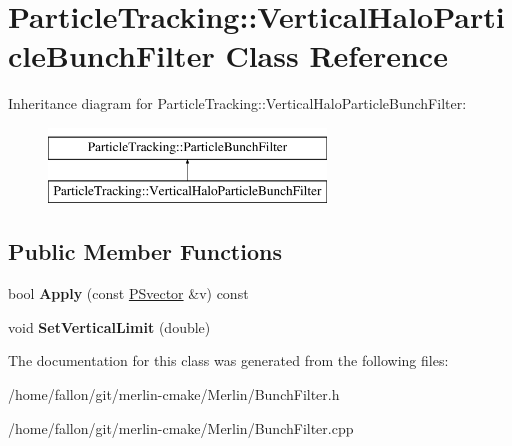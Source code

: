 \hypertarget{classParticleTracking_1_1VerticalHaloParticleBunchFilter}{}\section{Particle\+Tracking\+:\+:Vertical\+Halo\+Particle\+Bunch\+Filter Class Reference}
\label{classParticleTracking_1_1VerticalHaloParticleBunchFilter}
Inheritance diagram for Particle\+Tracking\+:\+:Vertical\+Halo\+Particle\+Bunch\+Filter\+:\begin{figure}[H]
\begin{center}
\leavevmode
\includegraphics[height=2.000000cm]{classParticleTracking_1_1VerticalHaloParticleBunchFilter}
\end{center}
\end{figure}
\subsection*{Public Member Functions}
\begin{DoxyCompactItemize}
\item 
\mbox{\label{classParticleTracking_1_1VerticalHaloParticleBunchFilter_ab3215c044fcf9bb25e805e70419991ea}} 
bool {\bfseries Apply} (const \hyperlink{classPSvector}{P\+Svector} \&v) const
\item 
\mbox{\label{classParticleTracking_1_1VerticalHaloParticleBunchFilter_a42ec4868b826388841e66b06d1fd2922}} 
void {\bfseries Set\+Vertical\+Limit} (double)
\end{DoxyCompactItemize}


The documentation for this class was generated from the following files\+:\begin{DoxyCompactItemize}
\item 
/home/fallon/git/merlin-\/cmake/\+Merlin/Bunch\+Filter.\+h\item 
/home/fallon/git/merlin-\/cmake/\+Merlin/Bunch\+Filter.\+cpp\end{DoxyCompactItemize}

